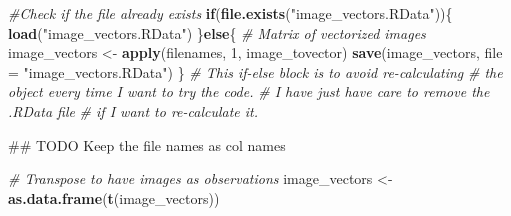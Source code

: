 \documentclass[]{article}
\newenvironment{Shaded}{\begin{snugshade}}{\end{snugshade}}
\newcommand{\KeywordTok}[1]{\textcolor[rgb]{0.13,0.29,0.53}{\textbf{#1}}}
\newcommand{\DataTypeTok}[1]{\textcolor[rgb]{0.13,0.29,0.53}{#1}}
\newcommand{\DecValTok}[1]{\textcolor[rgb]{0.00,0.00,0.81}{#1}}
\newcommand{\StringTok}[1]{\textcolor[rgb]{0.31,0.60,0.02}{#1}}
\newcommand{\CommentTok}[1]{\textcolor[rgb]{0.56,0.35,0.01}{\textit{#1}}}
\newcommand{\OtherTok}[1]{\textcolor[rgb]{0.56,0.35,0.01}{#1}}
\newcommand{\ControlFlowTok}[1]{\textcolor[rgb]{0.13,0.29,0.53}{\textbf{#1}}}
\newcommand{\OperatorTok}[1]{\textcolor[rgb]{0.81,0.36,0.00}{\textbf{#1}}}
\newcommand{\AlertTok}[1]{\textcolor[rgb]{0.94,0.16,0.16}{#1}}
\newcommand{\NormalTok}[1]{#1}
\begin{document}
\begin{Shaded}
\end{Shaded}

\begin{Shaded}
\begin{Highlighting}[]
\CommentTok{#Check if the file already exists}
\ControlFlowTok{if}\NormalTok{(}\KeywordTok{file.exists}\NormalTok{(}\StringTok{"image_vectors.RData"}\NormalTok{))\{}
  \KeywordTok{load}\NormalTok{(}\StringTok{"image_vectors.RData"}\NormalTok{)}
\NormalTok{\}}\ControlFlowTok{else}\NormalTok{\{}
\CommentTok{# Matrix of vectorized images}
\NormalTok{image_vectors <-}\StringTok{ }\KeywordTok{apply}\NormalTok{(filenames, }\DecValTok{1}\NormalTok{, image_tovector)}
\KeywordTok{save}\NormalTok{(image_vectors, }\DataTypeTok{file =} \StringTok{"image_vectors.RData"}\NormalTok{)}
\NormalTok{\}}
\CommentTok{# This if-else block is to avoid re-calculating }
\CommentTok{# the object every time I want to try the code.}
\CommentTok{# I have just have care to remove the .RData file}
\CommentTok{# if I want to re-calculate it.}

\NormalTok{## }\AlertTok{TODO}\NormalTok{ Keep the file names as col names}

\CommentTok{# Transpose to have images as observations}
\NormalTok{image_vectors <-}\StringTok{ }\KeywordTok{as.data.frame}\NormalTok{(}\KeywordTok{t}\NormalTok{(image_vectors))}
\end{Highlighting}
\end{Shaded}
\end{document}
